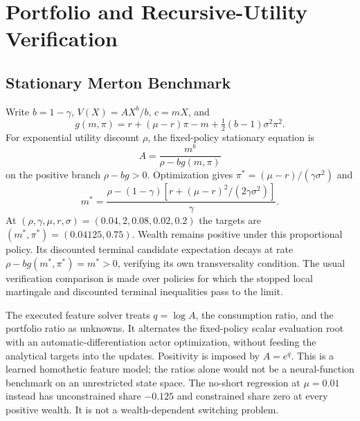 \section{Portfolio and Recursive-Utility Verification}
\subsection{Stationary Merton Benchmark}
Write $b=1-\gamma$, $V(X)=AX^b/b$, $c=mX$, and
\[
 g(m,\pi)=r+(\mu-r)\pi-m+\tfrac12(b-1)\sigma^2\pi^2.
\]
For exponential utility discount $\rho$, the fixed-policy stationary equation is
\[
 A=\frac{m^b}{\rho-bg(m,\pi)}
\]
on the positive branch $\rho-bg>0$. Optimization gives $\pi^*=(\mu-r)/(\gamma\sigma^2)$ and
\[
 m^*=\frac{\rho-(1-\gamma)[r+(\mu-r)^2/(2\gamma\sigma^2)]}{\gamma}.
\]
At $(\rho,\gamma,\mu,r,\sigma)=(0.04,2,0.08,0.02,0.2)$ the targets are $(m^*,\pi^*)=(0.04125,0.75)$. Wealth remains positive under this proportional policy. Its discounted terminal candidate expectation decays at rate $\rho-bg(m^*,\pi^*)=m^*>0$, verifying its own transversality condition. The usual verification comparison is made over policies for which the stopped local martingale and discounted terminal inequalities pass to the limit.

The executed feature solver treats $q=\log A$, the consumption ratio, and the portfolio ratio as unknowns. It alternates the fixed-policy scalar evaluation root with an automatic-differentiation actor optimization, without feeding the analytical targets into the updates. Positivity is imposed by $A=e^q$. This is a learned homothetic feature model; the ratios alone would not be a neural-function benchmark on an unrestricted state space. The no-short regression at $\mu=0.01$ instead has unconstrained share $-0.125$ and constrained share zero at every positive wealth. It is not a wealth-dependent switching problem.

